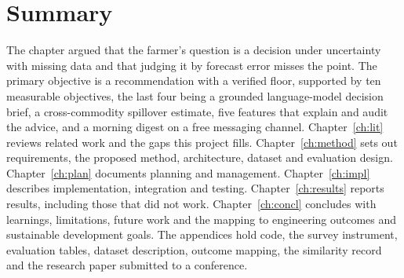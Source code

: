\section{Summary}
\label{sec:intro-summary}

The chapter argued that the farmer's question is a decision under uncertainty with missing data and that judging it by forecast error misses the point. The primary objective is a recommendation with a verified floor, supported by ten measurable objectives, the last four being a grounded language-model decision brief, a cross-commodity spillover estimate, five features that explain and audit the advice, and a morning digest on a free messaging channel. Chapter~\ref{ch:lit} reviews related work and the gaps this project fills. Chapter~\ref{ch:method} sets out requirements, the proposed method, architecture, dataset and evaluation design. Chapter~\ref{ch:plan} documents planning and management. Chapter~\ref{ch:impl} describes implementation, integration and testing. Chapter~\ref{ch:results} reports results, including those that did not work. Chapter~\ref{ch:concl} concludes with learnings, limitations, future work and the mapping to engineering outcomes and sustainable development goals. The appendices hold code, the survey instrument, evaluation tables, dataset description, outcome mapping, the similarity record and the research paper submitted to a conference.
